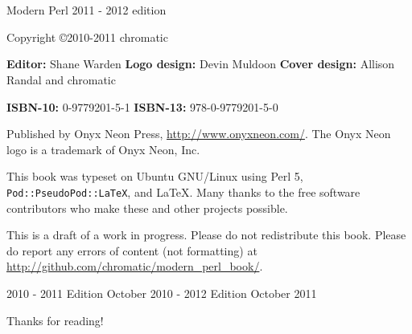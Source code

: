 \chapter*{}
\thispagestyle{empty}

\huge{Modern Perl}
\newline
\large{2011 - 2012 edition}
\newline
\newline
\normalsize

Copyright \copyright\mbox{}2010-2011 chromatic

\vfill
\textbf{Editor:} Shane Warden\newline
\textbf{Logo design:} Devin Muldoon\newline
\textbf{Cover design:} Allison Randal and chromatic

\textbf{ISBN-10:} 0-9779201-5-1\newline
\textbf{ISBN-13:} 978-0-9779201-5-0

Published by Onyx Neon Press, \url{http://www.onyxneon.com/}.
The Onyx Neon logo is a trademark of Onyx Neon, Inc.

This book was typeset on Ubuntu GNU/Linux using Perl 5,
\textnhtt{Pod::PseudoPod::LaTeX}, and \LaTeX. Many thanks to the free software
contributors who make these and other projects possible.

This is a draft of a work in progress. Please do not redistribute this book.
Please do report any errors of content (not formatting) at \url{http://github.com/chromatic/modern_perl_book/}.

2010 - 2011 Edition October 2010 - 2012 Edition October 2011

Thanks for reading!

